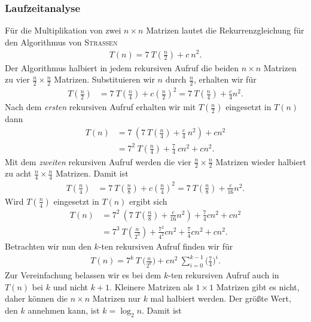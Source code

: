 \documentclass{report}
\numberwithin{equation}{section}
\begin{document}
\subsubsection{Laufzeitanalyse}
Für die Multiplikation von zwei $n \times n$ Matrizen lautet die Rekurrenzgleichung für den Algorithmus von \textsc{Strassen}
\begin{align*}
	T(n) = 7 \: T(\tfrac{n}{2}) + c\: n^2.
\end{align*}
Der Algorithmus halbiert in jedem rekursiven Aufruf die beiden $n \times n$ Matrizen zu vier $\tfrac{n}{2} \times \tfrac{n}{2}$ Matrizen. Substituieren wir $n$ durch $\tfrac{n}{2}$, erhalten wir für
\begin{align*}
	T(\tfrac{n}{2}) &= 7 \: T(\tfrac{n}{4}) + c(\tfrac{n}{2})^2 = 7 \: T(\tfrac{n}{4}) + \tfrac{c}{4}n^2.
\end{align*}
Nach dem \textit{ersten} rekursiven Aufruf erhalten wir mit $T(\frac{n}{2})$ eingesetzt in $T(n)$ dann
\begin{align*}
	T(n) &= 7 \: (7 \: T(\tfrac{n}{4}) + \tfrac{c}{4} \: n^2) + c n^2 \\
	&= 7^2\: T(\tfrac{n}{4}) + \tfrac{7}{4} \: cn^2 + c n^2.
\end{align*}
Mit dem \textit{zweiten} rekursiven Aufruf werden die vier $\tfrac{n}{2} \times \tfrac{n}{2}$ Matrizen wieder halbiert zu acht $\tfrac{n}{4} \times \tfrac{n}{4}$ Matrizen. Damit ist
\begin{align*}
	T(\tfrac{n}{4}) &= 7 \: T(\tfrac{n}{8}) + c(\tfrac{n}{4})^2 = 7 \: T(\tfrac{n}{8}) + \tfrac{c}{16}n^2.
\end{align*}
Wird $T(\tfrac{n}{4})$ eingesetzt in $T(n)$ ergibt sich
\begin{align*}
	T(n) &= 7^2\: (7 \: T(\tfrac{n}{8}) + \tfrac{c}{16}n^2) + \tfrac{7}{4}cn^2 + c n^2 \\
	&= 7^3\: T(\tfrac{n}{2^3}) + \tfrac{7^2}{4^2}cn^2 + \tfrac{7}{4}cn^2 + c n^2.
\end{align*}
Betrachten wir nun den $k$-ten rekursiven Aufruf finden wir für 
\begin{align*}
	T(n) = 7^k \: T \: \big(\tfrac{n}{2^k}\big) + cn^2 \: \sum_{i = 0}^{k-1} \bigg(\frac{7}{4}\bigg)^i.
\end{align*}
Zur Vereinfachung belassen wir es bei dem $k$-ten rekursiven Aufruf auch in $T(n)$ bei $k$ und nicht $k + 1$. Kleinere Matrizen als $1 \times 1$ Matrizen gibt es nicht, daher können die $n \times n$ Matrizen nur $k$ mal halbiert werden. Der größte Wert, den $k$ annehmen kann, ist $k = \log_{2}n$. Damit ist
\end{document}
